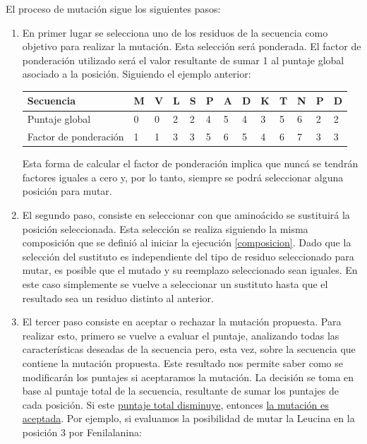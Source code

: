 El proceso de mutación sigue los siguientes pasos:
\begin{enumerate}
 \item En primer lugar se selecciona uno de los residuos de la secuencia como objetivo para realizar la mutación. 
 Esta selección será ponderada. El factor de ponderación utilizado será el valor resultante de sumar 1 al puntaje global asociado a la posición.
 Siguiendo el ejemplo anterior:
 
 \begin{tabular}{lllllllllllll} 
 \hline
Secuencia &  \textbf{M} & \textbf{V} & \textbf{L} & \textbf{S} & \textbf{P} & \textbf{A} & \textbf{D} & \textbf{K} & \textbf{T} & \textbf{N} & \textbf{P} & \textbf{D}\\  \hline
Puntaje global & 0 & 0 & 2 & 2 & 4 & 5 & 4 & 3 & 5 & 6 & 2 & 2\\  \hline
Factor de ponderación & 1 & 1 & 3 & 3 & 5 & 6 & 5 & 4 & 6 & 7 & 3 & 3\\  \hline
\end{tabular}
 
\vspace{0.5cm}
Esta forma de calcular el factor de ponderación implica que nuncá se tendrán factores iguales a cero y, por lo tanto, siempre se podrá seleccionar alguna posición para mutar.

   \item El segundo paso, consiste en seleccionar con que aminoácido se sustituirá la posición seleccionada. 
   Esta selección se realiza siguiendo la misma composición que se definió al iniciar la ejecución \ref{composicion}. 
   Dado que la selección del sustituto es independiente del tipo de residuo seleccionado para mutar,
   es posible que el mutado y su reemplazo seleccionado sean iguales. 
   En este caso simplemente se vuelve a seleccionar un sustituto hasta que el resultado sea un residuo distinto al anterior.     
    \item El tercer paso consiste en aceptar o rechazar la mutación propuesta.
    Para realizar esto, primero se vuelve a evaluar el puntaje, analizando todas las características deseadas de la secuencia pero, esta vez, sobre la secuencia que contiene la mutación propuesta.
    Este resultado nos permite saber como se modificarán los puntajes si aceptaramos la mutación. 
    La decisión se toma en base al puntaje total de la secuencia, resultante de sumar los puntajes de cada posición. Si este  \underline{puntaje total disminuye}, entonces \underline{la mutación es aceptada}. 
    Por ejemplo, si evaluamos la posibilidad de mutar la Leucina en la posición 3 por Fenilalanina:


\end{enumerate}
